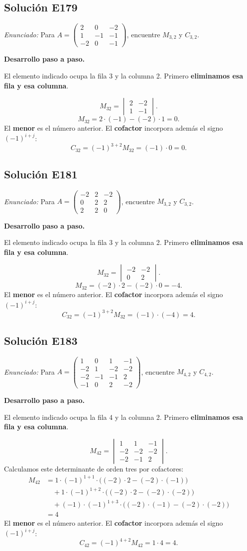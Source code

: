\documentclass[12pt]{article}
\theoremstyle{remark}
\newcommand{\solucion}[2]{\Needspace{11\baselineskip}\subsection*{Solución E#1}\noindent\textit{Enunciado:} #2\par\medskip\noindent\textbf{Desarrollo paso a paso.}\par\medskip}
\begin{document}
\medskip

\solucion{179}{Para $A=\begin{pmatrix}2&0&-2\\1&-1&-1\\-2&0&-1\end{pmatrix}$, encuentre $M_{3,2}$ y $C_{3,2}$.}
El elemento indicado ocupa la fila 3 y la columna 2. Primero \textbf{eliminamos esa fila y esa columna}.

\[
M_{32}=\begin{vmatrix}2&-2\\1&-1\end{vmatrix}.
\]
\[
M_{32}=2\cdot (-1)-(-2)\cdot 1=0.
\]
El \textbf{menor} es el número anterior. El \textbf{cofactor} incorpora además el signo $(-1)^{i+j}$:
\[
\boxed{C_{32}=(-1)^{3+2}M_{32}=(-1)\cdot 0=0}.
\]

\medskip

\solucion{181}{Para $A=\begin{pmatrix}-2&2&-2\\0&2&2\\2&2&0\end{pmatrix}$, encuentre $M_{3,2}$ y $C_{3,2}$.}
El elemento indicado ocupa la fila 3 y la columna 2. Primero \textbf{eliminamos esa fila y esa columna}.

\[
M_{32}=\begin{vmatrix}-2&-2\\0&2\end{vmatrix}.
\]
\[
M_{32}=(-2)\cdot 2-(-2)\cdot 0=-4.
\]
El \textbf{menor} es el número anterior. El \textbf{cofactor} incorpora además el signo $(-1)^{i+j}$:
\[
\boxed{C_{32}=(-1)^{3+2}M_{32}=(-1)\cdot (-4)=4}.
\]

\medskip

\solucion{183}{Para $A=\begin{pmatrix}1&0&1&-1\\-2&1&-2&-2\\-2&-1&-1&2\\-1&0&2&-2\end{pmatrix}$, encuentre $M_{4,2}$ y $C_{4,2}$.}
El elemento indicado ocupa la fila 4 y la columna 2. Primero \textbf{eliminamos esa fila y esa columna}.

\[
M_{42}=\begin{vmatrix}1&1&-1\\-2&-2&-2\\-2&-1&2\end{vmatrix}.
\]
Calculamos este determinante de orden tres por cofactores:
\[
\begin{aligned}M_{42}&=1\cdot (-1)^{1+1}\cdot\bigl((-2)\cdot 2-(-2)\cdot (-1)\bigr)\\&\quad + 1\cdot (-1)^{1+2}\cdot\bigl((-2)\cdot 2-(-2)\cdot (-2)\bigr)\\&\quad + (-1)\cdot (-1)^{1+3}\cdot\bigl((-2)\cdot (-1)-(-2)\cdot (-2)\bigr)\\&=4\end{aligned}
\]
El \textbf{menor} es el número anterior. El \textbf{cofactor} incorpora además el signo $(-1)^{i+j}$:
\[
\boxed{C_{42}=(-1)^{4+2}M_{42}=1\cdot 4=4}.
\]
\end{document}
